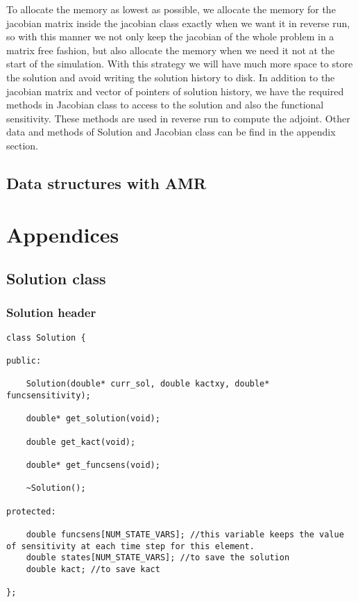 \documentclass[a4paper,10pt]{article}
\begin{document}
To allocate the memory as lowest as possible, we allocate the memory for the jacobian matrix inside the jacobian class exactly when we want it in reverse run, so with this manner we not only keep the jacobian of the whole problem in a matrix free fashion, but also allocate the memory when we need it not at the start of the simulation. With this strategy we will have much more space to store the solution and avoid writing the solution history to disk. In addition to the jacobian matrix and vector of pointers of solution history, we have the required methods in Jacobian class to access to the solution and also the functional sensitivity. These methods are used in reverse run to compute the adjoint. Other data and methods of Solution and Jacobian class can be find in the appendix section.


\subsection{Data structures with AMR}   
\newpage
\appendix
\section*{Appendices}\label{appendix}
\renewcommand{\thesubsection}{\Alph{subsection}}

\subsection{Solution class}
\subsubsection{Solution header}
\begin{lstlisting}
class Solution {

public:

	Solution(double* curr_sol, double kactxy, double* funcsensitivity);

	double* get_solution(void);

	double get_kact(void);

	double* get_funcsens(void);

	~Solution();

protected:

	double funcsens[NUM_STATE_VARS]; //this variable keeps the value of sensitivity at each time step for this element.
	double states[NUM_STATE_VARS]; //to save the solution
	double kact; //to save kact

};
\end{lstlisting}
\end{document}
